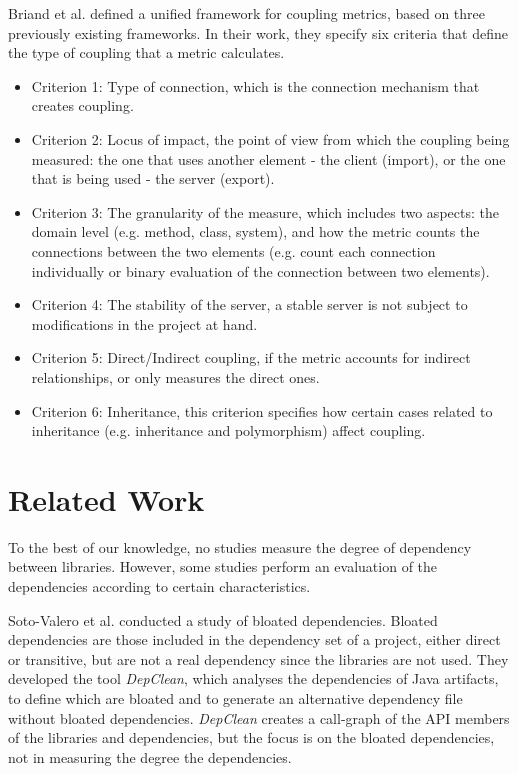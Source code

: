 \documentclass[a4paper]{article}
\begin{document}
Briand et al. \cite{briand1999unified} defined a unified framework for coupling metrics, based on three previously existing frameworks. In their work, they specify six criteria that define the type of coupling that a metric calculates.

\begin{itemize}
    \item Criterion 1: Type of connection, which is the connection mechanism that creates coupling.
    \item Criterion 2: Locus of impact, the point of view from which the coupling being measured: the one that uses another element - the client (import), or the one that is being used - the server (export).
    \item Criterion 3: The granularity of the measure, which includes two aspects: the domain level (e.g. method, class, system), and how the metric counts the connections between the two elements (e.g. count each connection individually or binary evaluation of the connection between two elements).
    \item Criterion 4: The stability of the server, a stable server is not subject to modifications in the project at hand.
    \item Criterion 5: Direct/Indirect coupling, if the metric accounts for indirect relationships, or only measures the direct ones.
    \item Criterion 6: Inheritance, this criterion specifies how certain cases related to inheritance (e.g. inheritance and polymorphism) affect coupling.
\end{itemize}

\section{Related Work}
To the best of our knowledge, no studies measure the degree of dependency between libraries. However, some studies perform an evaluation of the dependencies according to certain characteristics.

Soto-Valero et al. \cite{soto2020comprehensive} conducted a study of bloated dependencies. Bloated dependencies are those included in the dependency set of a project, either direct or transitive, but are not a real dependency since the libraries are not used. They developed the tool \textit{DepClean}, which analyses the dependencies of Java artifacts, to define which are bloated and to generate an alternative dependency file without bloated dependencies. \textit{DepClean} creates a call-graph of the API members of the libraries and dependencies, but the focus is on the bloated dependencies, not in measuring the degree the dependencies.
\end{document}
